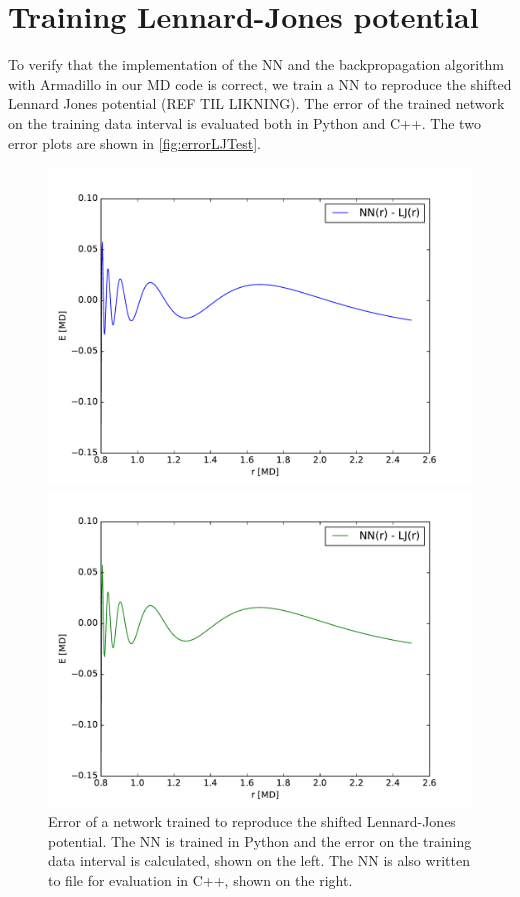 \documentclass[twoside,english]{uiofysmaster}
\begin{document}
\section{Training Lennard-Jones potential}
To verify that the implementation of the NN and the backpropagation algorithm with Armadillo in our MD code is correct, 
we train a NN to reproduce the shifted Lennard Jones potential (REF TIL LIKNING). 
The error of the trained network on the training data interval is evaluated both in Python and C++. The two error
plots are shown in \autoref{fig:errorLJTest}. 
\begin{figure}[H]
\begin{minipage}[t]{0.48\linewidth}
  \includegraphics[width=\textwidth]{Figures/Tests/errorLJ.pdf}
\end{minipage}
\quad
\begin{minipage}[t]{0.48\linewidth}
\includegraphics[width=\textwidth]{Figures/Tests/errorLJC.pdf}
\end{minipage}
  \caption{Error of a network trained to reproduce the shifted Lennard-Jones potential. 
           The NN is trained in Python and the error on the training data interval
           is calculated, shown on the left. The NN is also written to file for evaluation in C++, 
           shown on the right.}
\label{fig:errorLJTest}
\end{figure}
\end{document}
